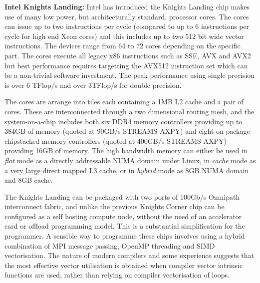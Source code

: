 \documentclass{PoS}
\begin{document}
{\bf Intel Knights Landing:}
Intel has introduced the Knights Landing chip\cite{sodani} makes use of many low power, but architecturally standard, 
processor cores. The cores can issue up to two instructions per cycle (compared to up to 6 instructions per cycle for high end Xeon cores)
and this includes up to two 512 bit wide vector instructions. The devices range from 64 to 72 cores depending
on the specific part. The cores execute all legacy x86 instructions such as SSE, AVX and AVX2 but best performance
requires targetting the AVX512 instruction set which can be a non-trivial software investment. The peak performance using
single precision is over 6 TFlop/s and over 3TFlop/s for double precision.

The cores are arrange into tiles each containing a 1MB L2 cache and a pair of cores. These
are interconnected through a two dimensional routing mesh, and the system-on-a-chip includes both
six DDR4 memory controllers providing up to 384GB of memory
(quoted at 90GB/s STREAMS AXPY) and eight on-package chipstacked memory controllers (quoted at 400GB/s STREAMS AXPY) 
providing 16GB of memory.
The high bandwidth memory can either be used in \emph{flat} mode as a directly addressable NUMA domain under Linux, in \emph{cache} mode
as a very large direct mapped L3 cache, or in \emph{hybrid} mode as 8GB NUMA domain and 8GB cache.

The Knights Landing can be packaged with two ports of 100Gb/s Omnipath interconnect fabric, and unlike the previous
Knights Corner chip can be configured as a self hosting compute node, without the need of an accelerator card or offload
programming model. This is a substantial simplification for the programmer.
A sensible way to programme these chips involves using a hybrid combination of MPI message passing, OpenMP threading and
SIMD vectorisation. The nature of modern compilers and some experience suggests that the most effective vector utilisation
is obtained when compiler vector intrinsic functions are used, rather than relying on compiler vectorisation of loops.
\end{document}
